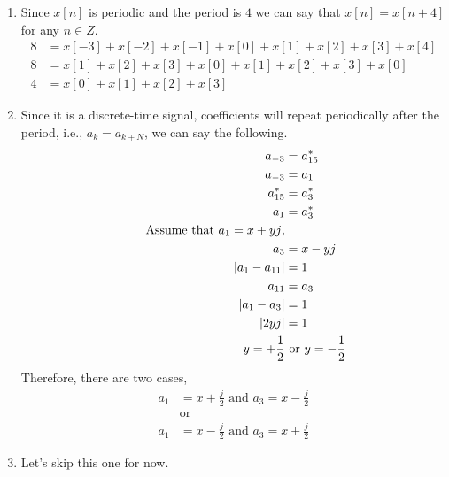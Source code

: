 \documentclass[10pt,a4paper, margin=1in]{article}
\begin{document}
\begin{enumerate}
\begin{enumerate}
    \item
    
    Since $x[n]$ is periodic and the period is $4$ we can say that $x[n]=x[n+4]$ for any $n\in Z$.
    \begin{equation}\label{qwe}
    \begin{split}
    	8 & = x[-3]+x[-2]+x[-1]+x[0]+x[1]+x[2]+x[3]+x[4] \\
	8 & = x[1]+x[2]+x[3]+x[0]+x[1]+x[2]+x[3]+x[0] \\
	4 & = x[0]+x[1]+x[2]+x[3]
    \end{split}
    \end{equation}
    
    \item
    
    Since it is a discrete-time signal, coefficients will repeat periodically after the period, i.e., $a_k=a_{k+N}$, we can say the following. 
    \begin{equation}
    \begin{split}
    	a_{-3} & = a_{15}^* \\
	a_{-3} & =a_1 \\
	a_{15}^* & =a_3^* \\
	a_1 & = a_3^* \\
	\text{\qquad Assume that $a_1=x+yj$,} \\
	a_3 & = x-yj \\
	|a_1-a_{11}| & = 1\\
	a_{11} & = a_3 \\
	|a_1-a_3| & = 1 \\
	|2yj| & = 1 \\
	y = +\frac{1}{2} & \text{ or } y = -\frac{1}{2}
    \end{split}
    \end{equation}
    Therefore, there are two cases,
     \begin{equation}\label{asd}
    \begin{split}
    	a_1 & = x + \frac{j}{2} \text{ and } a_3 = x - \frac{j}{2} \\
	& \text{or} \\
	a_1 & = x - \frac{j}{2} \text{ and } a_3 = x + \frac{j}{2} 
    \end{split}
    \end{equation}
    
    \item
    	Let's skip this one for now.\\


\end{enumerate}
\end{enumerate}
\end{document}
